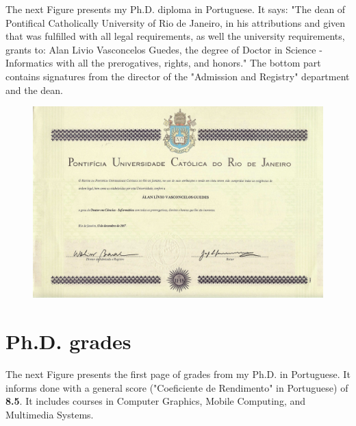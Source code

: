 \documentclass[10pt,a4paper,sans,colorlinks]{moderncv}
\begin{document}
The next Figure presents my Ph.D. diploma in Portuguese.
It says: "The dean of Pontifical Catholically University of Rio de Janeiro, in his attributions and given that was fulfilled with all legal requirements, as well the university requirements, grants to: Alan Livio Vasconcelos Guedes, the degree of Doctor in Science - Informatics with all the prerogatives, rights, and honors."
The bottom part contains signatures from the director of the "Admission and Registry" department and the dean.

\begin{figure}
    \centering
    \includegraphics[align=t,width=\textwidth,height=0.75\textheight, keepaspectratio=true, trim={6cm 0 3cm 0},clip]{certificates/phd-diploma.pdf}
\end{figure}

\newpage

\section{Ph.D. grades}

The next Figure presents the first page of grades from my Ph.D. in Portuguese.
It informs done with a general score ("Coeficiente de Rendimento" in Portuguese) of \textbf{8.5}.
It includes courses in Computer Graphics, Mobile Computing, and Multimedia Systems.
\end{document}
